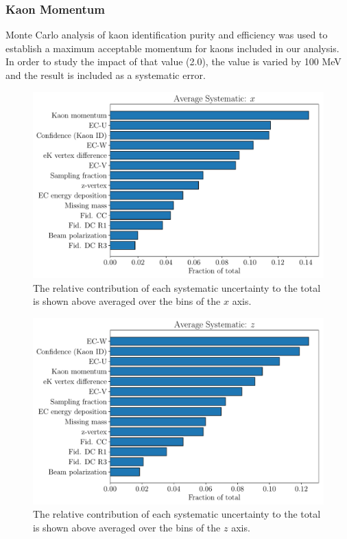 \subsubsection*{Kaon Momentum}
Monte Carlo analysis of kaon identification purity and efficiency was used to establish a maximum acceptable momentum for kaons included in our analysis.  In order to study the impact of that value (2.0), the value is varied by 100 MeV and the result is included as a systematic error.  

\begin{figure}
	\centering
	\includegraphics[width=16cm]{image/plots/kaon-bsa/bar-systematics-x.pdf}
	\caption{The relative contribution of each systematic uncertainty to the total is shown above averaged over the bins of the $x$ axis.}
\end{figure}

\begin{figure}
	\centering
	\includegraphics[width=16cm]{image/plots/kaon-bsa/bar-systematics-z.pdf}
	\caption{The relative contribution of each systematic uncertainty to the total is shown above averaged over the bins of the $z$ axis.}
\end{figure}


